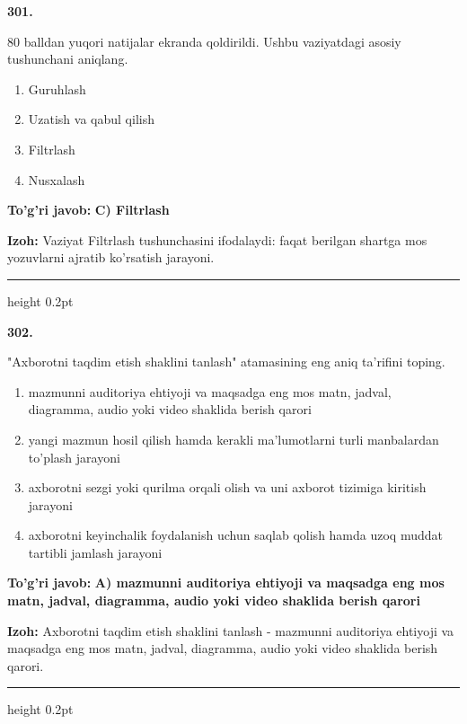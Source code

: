 \documentclass[10pt,a4paper,oneside]{article}
\begin{document}
\noindent\textbf{\color{ink}301.}
\par
80 balldan yuqori natijalar ekranda qoldirildi. Ushbu vaziyatdagi asosiy tushunchani aniqlang.
\begin{enumerate}[label=\Alph*),leftmargin=9mm]
\item Guruhlash
\item Uzatish va qabul qilish
\item Filtrlash
\item Nusxalash
\end{enumerate}
\begin{tcolorbox}[enhanced,breakable,colback=teal!4,colframe=teal!50!black,boxrule=0.5pt,arc=1.1mm,left=3mm,right=3mm,top=1.7mm,bottom=1.7mm,before skip=2mm,after skip=2mm]
\textbf{\color{teal}To'g'ri javob:} \textbf{C) Filtrlash}
\par\smallskip
\textbf{Izoh:} Vaziyat Filtrlash tushunchasini ifodalaydi: faqat berilgan shartga mos yozuvlarni ajratib ko'rsatish jarayoni.
\end{tcolorbox}
\vspace{2mm}\hrule height 0.2pt \vspace{3mm}

\noindent\textbf{\color{ink}302.}
\par
"Axborotni taqdim etish shaklini tanlash" atamasining eng aniq ta'rifini toping.
\begin{enumerate}[label=\Alph*),leftmargin=9mm]
\item mazmunni auditoriya ehtiyoji va maqsadga eng mos matn, jadval, diagramma, audio yoki video shaklida berish qarori
\item yangi mazmun hosil qilish hamda kerakli ma'lumotlarni turli manbalardan to'plash jarayoni
\item axborotni sezgi yoki qurilma orqali olish va uni axborot tizimiga kiritish jarayoni
\item axborotni keyinchalik foydalanish uchun saqlab qolish hamda uzoq muddat tartibli jamlash jarayoni
\end{enumerate}
\begin{tcolorbox}[enhanced,breakable,colback=teal!4,colframe=teal!50!black,boxrule=0.5pt,arc=1.1mm,left=3mm,right=3mm,top=1.7mm,bottom=1.7mm,before skip=2mm,after skip=2mm]
\textbf{\color{teal}To'g'ri javob:} \textbf{A) mazmunni auditoriya ehtiyoji va maqsadga eng mos matn, jadval, diagramma, audio yoki video shaklida berish qarori}
\par\smallskip
\textbf{Izoh:} Axborotni taqdim etish shaklini tanlash - mazmunni auditoriya ehtiyoji va maqsadga eng mos matn, jadval, diagramma, audio yoki video shaklida berish qarori.
\end{tcolorbox}
\vspace{2mm}\hrule height 0.2pt \vspace{3mm}
\end{document}

